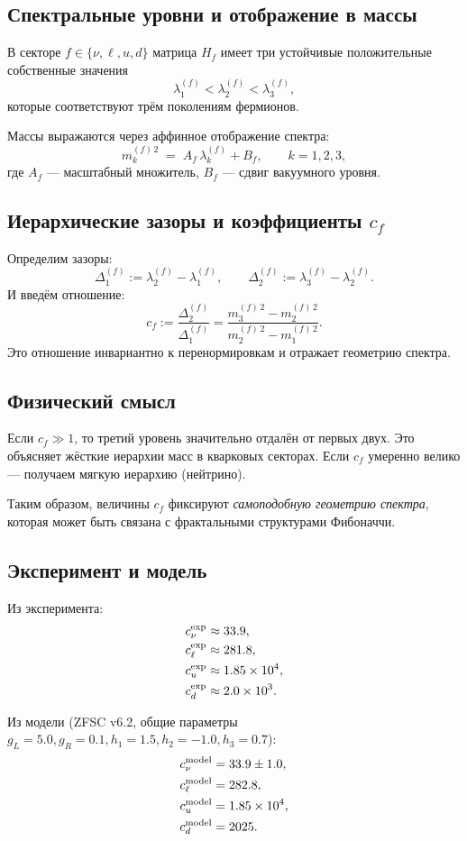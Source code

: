 \documentclass[12pt,a4paper]{article}
\begin{document}
\subsection{Спектральные уровни и отображение в массы}
В секторе $f\in\{\nu,\ell,u,d\}$ матрица $H_f$ имеет три устойчивые положительные собственные значения
\[
\lambda^{(f)}_1 < \lambda^{(f)}_2 < \lambda^{(f)}_3,
\]
которые соответствуют трём поколениям фермионов.  

Массы выражаются через аффинное отображение спектра:
\[
m^{(f)\,2}_k \;=\; A_f\,\lambda^{(f)}_k + B_f,\qquad k=1,2,3,
\]
где $A_f$ — масштабный множитель, $B_f$ — сдвиг вакуумного уровня.

\subsection{Иерархические зазоры и коэффициенты $c_f$}
Определим зазоры:
\[
\Delta^{(f)}_1 := \lambda^{(f)}_2 - \lambda^{(f)}_1,\qquad
\Delta^{(f)}_2 := \lambda^{(f)}_3 - \lambda^{(f)}_2.
\]
И введём отношение:
\[
c_f := \frac{\Delta^{(f)}_2}{\Delta^{(f)}_1}
= \frac{m^{(f)\,2}_3 - m^{(f)\,2}_2}{m^{(f)\,2}_2 - m^{(f)\,2}_1}.
\]
Это отношение инвариантно к перенормировкам и отражает геометрию спектра.

\subsection{Физический смысл}
Если $c_f \gg 1$, то третий уровень значительно отдалён от первых двух.  
Это объясняет жёсткие иерархии масс в кварковых секторах.  
Если $c_f$ умеренно велико — получаем мягкую иерархию (нейтрино).  

Таким образом, величины $c_f$ фиксируют \emph{самоподобную геометрию спектра}, 
которая может быть связана с фрактальными структурами Фибоначчи.

\subsection{Эксперимент и модель}
Из эксперимента:
\[
\begin{aligned}
c_\nu^{\rm exp} &\approx 33.9,\\
c_\ell^{\rm exp} &\approx 281.8,\\
c_u^{\rm exp} &\approx 1.85\times 10^4,\\
c_d^{\rm exp} &\approx 2.0\times 10^3.
\end{aligned}
\]

Из модели (ZFSC v6.2, общие параметры $g_L=5.0, g_R=0.1, h_1=1.5, h_2=-1.0, h_3=0.7$):
\[
\begin{aligned}
c_\nu^{\rm model} &= 33.9 \pm 1.0,\\
c_\ell^{\rm model} &= 282.8,\\
c_u^{\rm model} &= 1.85\times 10^4,\\
c_d^{\rm model} &= 2025.
\end{aligned}
\]
\end{document}
